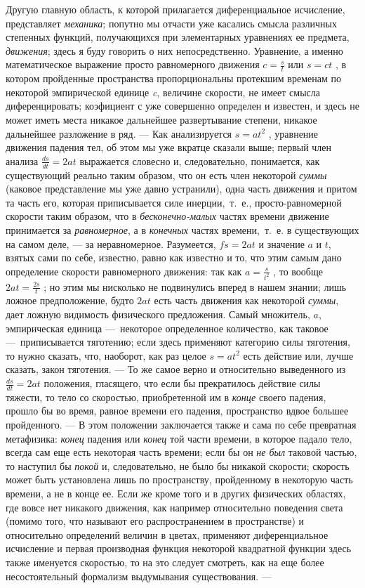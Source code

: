 {Другую главную область, к которой прилагается диференциальное исчисление,
представляет {\em механика}; попутно мы отчасти уже
касались смысла различных степенных функций, получающихся при элементарных
уравнениях ее предмета, {\em движения}; здесь я буду
говорить о них непосредственно. Уравнение, а именно математическое
выражение просто равномерного движения  $c=\frac s t$  или  $s=\mathit{ct}$
, в котором пройденные пространства пропорциональны протекшим временам по
некоторой эмпирической единице {\em c}, величине
скорости, не имеет смысла диференцировать; коэфициент с уже совершенно
определен и известен, и здесь не может иметь места никакое дальнейшее
развертывание степени, никакое дальнейшее разложение в ряд. — Как
анализируется  $s=at^2$ , уравнение движения падения тел, об этом мы уже
вкратце сказали выше; первый член анализа 
$\frac{\mathit{ds}}{\mathit{dt}}=2\mathit{at}$  выражается словесно и,
следовательно, понимается, как существующий реально таким образом, что он
есть член некоторой {\em суммы} (каковое представление
мы уже давно устранили), одна часть движения и притом та часть его, которая
приписывается силе инерции,~т.~е., просто-равномерной скорости таким
образом, что в {\em бесконечно-малых} частях времени
движение принимается за {\em равномерное}, а в
{\em конечных} частях времени,~т.~е. в существующих на
самом деле, — за неравномерное. Разумеется,  $\mathit{fs}=2\mathit{at}$  и
значение $a$ и $t$, взятых
сами по себе, известно, равно как известно и то, что этим самым дано
определение скорости равномерного движения: так как  $a=\frac s{t^2}$ , то
вообще  $2\mathit{at}=\frac{2s} t$ ; но этим мы нисколько не подвинулись
вперед в нашем знании; лишь ложное предположение, будто  $2\mathit{at}$ 
есть часть движения как некоторой {\em суммы}, дает
ложную видимость физического предложения. Самый множитель,
$a$, эмпирическая единица —~некоторое определенное
количество, как таковое —~приписывается тяготению; если здесь применяют
категорию силы тяготения, то нужно сказать, что, наоборот, как раз целое 
$s=at^2$  есть действие или, лучше сказать, закон тяготения. — То же самое
верно и относительно выведенного из 
$\frac{\mathit{ds}}{\mathit{dt}}=2\mathit{at}$  положения, гласящего, что
если бы прекратилось действие силы тяжести, то тело со скоростью,
приобретенной им в {\em конце} своего падения, прошло
бы во время, равное времени его падения, пространство вдвое большее
пройденного. — В этом положении заключается также и сама по себе превратная
метафизика: {\em конец} падения или
{\em конец} той части времени, в которое падало тело,
всегда сам еще есть некоторая часть времени; если бы он
{\em не был} таковой частью, то наступил бы
{\em покой} и, следовательно, не было бы никакой
скорости; скорость может быть установлена лишь по пространству, пройденному
в некоторую часть времени, а не в конце ее. Если же кроме того и в других
физических областях, где вовсе нет никакого движения, как например
относительно поведения света (помимо того, что называют его
распространением в пространстве) и относительно определений величин в
цветах, применяют диференциальное исчисление и первая производная функция
некоторой квадратной функции здесь также именуется скоростью, то на это
следует смотреть, как на еще более несостоятельный формализм выдумывания
существования. —

}
